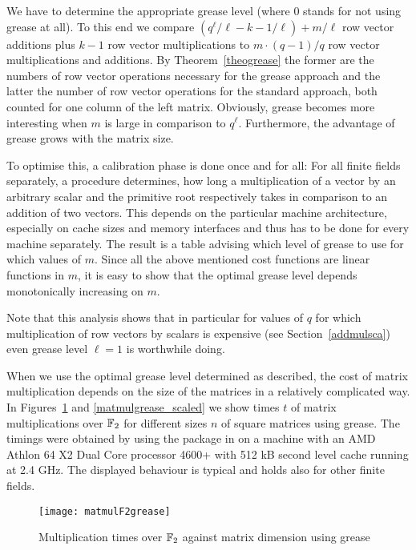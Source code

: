 We have to determine the appropriate grease level (where $0$ stands for not
using grease at all). To this end we 
compare $(q^\ell/\ell - k - 1/\ell) + m/\ell$ 
row vector additions plus $k-1$ row vector multiplications to
$m \cdot (q-1)/q$ row vector multiplications and additions.
By Theorem~\ref{theogrease} the former are the numbers of row vector
operations necessary for the grease approach and the latter the number
of row vector operations for the standard approach, both counted for
one column of the left matrix. Obviously, grease becomes more interesting 
when $m$ is large in comparison to $q^\ell$. 
Furthermore, the advantage of grease
grows with the matrix size.

To optimise this, a calibration phase is done once and for all: For all finite
fields separately, a procedure determines, how long a multiplication
of a vector by an arbitrary scalar and the primitive root respectively
takes in comparison to an addition of two vectors.
This depends on the particular machine architecture, especially on 
cache sizes and memory interfaces and thus has to be done for every
machine separately. The result is a table advising which level of grease
to use for which values of $m$. Since all the above mentioned cost
functions are linear functions in $m$, it is easy to show that the
optimal grease level depends monotonically increasing on $m$.

Note that this analysis shows that in particular for values of $q$
for which multiplication of row vectors by scalars is expensive (see
Section~\ref{addmulsca}) even grease level $\ell = 1$ is worthwhile
doing.

When we use the optimal grease level determined as described, the
cost of matrix multiplication depends on the size of the matrices
in a relatively complicated way. In Figures~\ref{matmulgrease} and
\ref{matmulgrease_scaled} we show times $t$ of matrix multiplications
over $\mathbb{F}_2$ for different sizes $n$ of square matrices using grease.
The timings were obtained by using the {\cvec} package in {\GAP} on a
machine with an AMD Athlon 64 X2 Dual Core processor 4600+ with 512
kB second level cache running at 2.4 GHz. The displayed behaviour is
typical and holds also for other finite fields.

\begin{figure}[ht]
\begin{center}
\texttt{[image: matmulF2grease]}
\end{center}
\caption{Multiplication times over $\mathbb{F}_2$ against matrix dimension
using grease}
\label{matmulgrease}
\end{figure}

